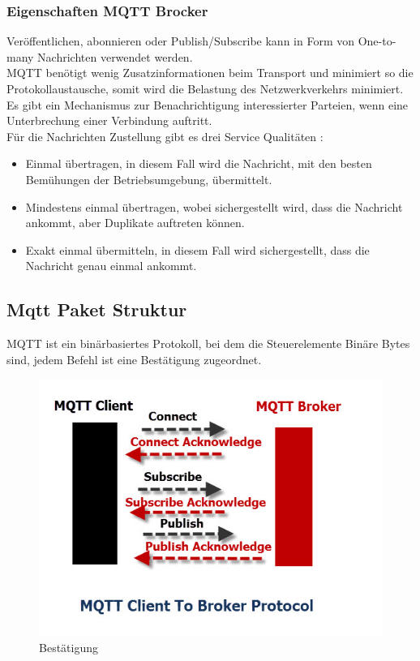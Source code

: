 \subsubsection{Eigenschaften MQTT Brocker}
Veröffentlichen, abonnieren oder  Publish/Subscribe kann in Form von One-to-many Nachrichten verwendet werden.\\
MQTT benötigt wenig Zusatzinformationen beim Transport und minimiert so die Protokollaustausche, somit wird die Belastung des Netzwerkverkehrs minimiert.\\
Es gibt ein Mechanismus zur Benachrichtigung interessierter Parteien, wenn eine Unterbrechung einer Verbindung auftritt.\\
Für die Nachrichten Zustellung gibt es drei Service Qualitäten \cite{noauthor_mqtt-v5.0.pdf_nodate}:\\
\begin{itemize}
	\item Einmal übertragen, in diesem Fall wird die Nachricht, mit den besten Bemühungen der Betriebsumgebung, übermittelt.\\
		\item Mindestens einmal übertragen, wobei sichergestellt wird, dass die Nachricht ankommt, aber Duplikate auftreten können.\\
	\item Exakt einmal übermitteln, in diesem Fall wird sichergestellt, dass die Nachricht genau einmal ankommt.
\end{itemize}

\subsection{Mqtt Paket Struktur}
MQTT ist ein binärbasiertes Protokoll, bei dem die Steuerelemente Binäre Bytes sind, jedem Befehl ist eine Bestätigung zugeordnet.

\begin{figure}[H]
	\centering
	\includegraphics[width=\textwidth]{graphics/MQTTProtocolCommands.jpg}
	\caption{Bestätigung} 	
	\label{pic: OverMQTT}
\end{figure} 

\

